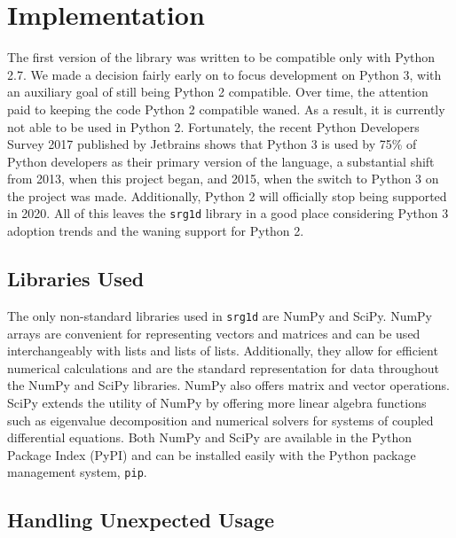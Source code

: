 \section{Implementation}

The first version of the library was written to be compatible only with Python 2.7. We made a decision fairly early on to focus development on Python 3, with an auxiliary goal of still being Python 2 compatible. Over time, the attention paid to keeping the code Python 2 compatible waned. As a result, it is currently not able to be used in Python 2. Fortunately, the recent Python Developers Survey 2017 published by Jetbrains shows that Python 3 is used by 75\% of Python developers as their primary version of the language, a substantial shift from 2013, when this project began, and 2015, when the switch to Python 3 on the project was made. Additionally, Python 2 will officially stop being supported in 2020. All of this leaves the \texttt{srg1d} library in a good place considering Python 3 adoption trends and the waning support for Python 2.

\subsection{Libraries Used}

The only non-standard libraries used in \texttt{srg1d} are NumPy and SciPy. NumPy arrays are convenient for representing vectors and matrices and can be used interchangeably with lists and lists of lists. Additionally, they allow for efficient numerical calculations and are the standard representation for data throughout the NumPy and SciPy libraries. NumPy also offers matrix and vector operations. SciPy extends the utility of NumPy by offering more linear algebra functions such as eigenvalue decomposition and numerical solvers for systems of coupled differential equations. Both NumPy and SciPy are available in the Python Package Index (PyPI) and can be installed easily with the Python package management system, \texttt{pip}.

\subsection{Handling Unexpected Usage}

